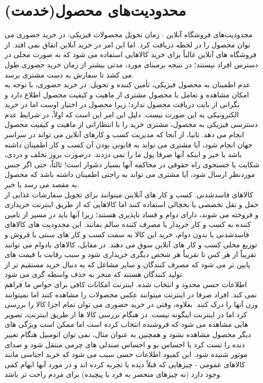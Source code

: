 \documentclass[14pt]{article}
\begin{document}
\section{ محدودیت‌های محصول(خدمت)}
محدودیت‌های فروشگاه آنلاین : 
زمان تحویل محصولات فیزیکی: در خرید حضوری می توان محصول را در لحظه دریافت کرد. اما این امر در خرید آنلاین اتفاق نمی افتد. از فروشگاه های آنلاین غالباً برای خرید کالاهایی استفاده می شود که به صورت محلی در دسترس افراد نیستند؛ در نتیجه برمبنای مورد، مدتی  بیشتر از زمان خرید حضوری طول می کشد تا سفارش به دست مشتری برسد.\\
عدم اطمینان به محصول فیزیکی، تأمین کننده و تحویل: در خرید حضوری، با توجه به امکان مشاهده و تعامل با محصول مشتری از ماهیت و کیفیت محصول اطلاع دارد و نگرانی از بابت دریافت محصول ندارد؛ زیرا محصول در اختیار اوست اما در خرید  الکترونیکی به این صورت نیست. دلیل این امر این است که اولاً، در شرایط عدم دسترسی فیزیکی به محصول، مشتری خرید را با انتظاراتی از ماهیت و کیفیت محصول انجام می دهد. ثانیا، از آنجا که مدیریت کسب و کارهای آنلاین می تواند در سراسر جهان انجام شود، آیا مشتری می تواند به قانونی بودن آن کسب و کار اطمینان داشته باشد یا خیر و اینکه آنها صرفا پول ما را نمی دزدند. درصورت بروز تخلف و دردی، شکایت یا جستجوی راه حقوقی در محاکمه آنها بسیار دشوار است! ثالثاً، حتی اگر جنس موردنظر ارسال شود، آیا مشتری می تواند به راحتی اطمینان داشته باشد که محصول به مقصد می رسد یا خیر.\\
کالاهای فاسدشدنی. کسب و کار های آنلاینن میتوانند برای تحویل سفارشات غذایی از حمل و نقل تخصصی یا یخچالی استفاده کنند اما کالاهایی که از طریق اینترنت خریداری و فروخته می شوند، دارای دوام و فساد ناپذیری هستند؛ زیرا آنها باید در مسیر از تامین کننده به کسب  و کار خریدار یا مصرف کننده سالم بمانند. این محدودیت های کالاهای فاسدشدنی یا بدون دوام، خرید این کالا به سمت کسب و کار های سنتی یا فروش و توزیع محلی کسب و کار های آنلاین سوق می دهند. در مقابل، کالاهای بادوام می توانند تقریباً از هر کس تا تقریباً هر شخص دیگری خریداری شود و سبب رقابت با قیمت های پایین تر می شود که مصرف کنندگان و سایر مشاغل که به دنبال خرید مستقیم تر از تولید کنندگان هستند که منجر به حذف واسطه گری می شود.\\
اطلاعات حسی محدود و انتخاب شده. اینترنت امکانات کافی برای حواس ما فراهم نمی کند. افراد صرفا در اینترنت میتوانند عکس محصولات را مشاهده کنند اما نمیتوانند وزن آنها را درک کنند. بعلاوه، وقتی در خرید حضوری می توان تمام اجزا کالا را بررسی کرد اما در اینترنت اینگونه نیست. در هنگام بررسی کالا ها از طریق اینترنت، تصویر هایی مشاهده می شود که فروشنده انتخاب کرده است اما ممکن است ویژگی های دیگر محصول مشاهده نشود و همچنین به عنوان مثال، نمی توان اتومبیل هنگام تغییر دنده را تست کرد یا احساس بو و احساس صندلی های چرمی منتقل شود و صدای موتور شنیده شود. این کمبود اطلاعات حسی سبب می شود که خرید اجناسی مانند کالاهای عمومی - چیزهایی که قبلاً دیده یا تجربه کرده اند و در مورد آنها ابهام کمی وجود دارد (نه چیزهای منحصر به فرد یا پیچیده) برای مردم راحت تر باشد.\\
\end{document}
